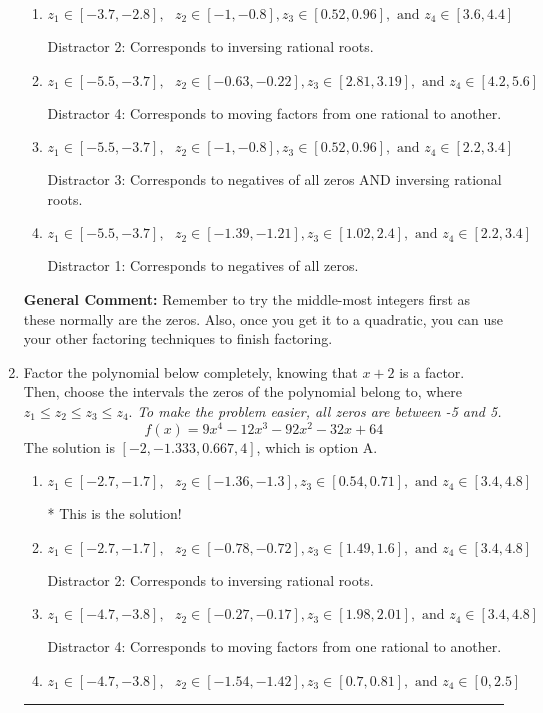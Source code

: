 \documentclass{extbook}[14pt]
\newcommand{\litem}[1]{\item #1

\rule{\textwidth}{0.4pt}}
\begin{document}
\begin{enumerate}
{\begin{enumerate}[label=\Alph*.]
* This is the solution!
\item \( z_1 \in [-3.7, -2.8], \text{   }  z_2 \in [-1, -0.8], z_3 \in [0.52, 0.96], \text{   and   } z_4 \in [3.6, 4.4] \)

 Distractor 2: Corresponds to inversing rational roots.
\item \( z_1 \in [-5.5, -3.7], \text{   }  z_2 \in [-0.63, -0.22], z_3 \in [2.81, 3.19], \text{   and   } z_4 \in [4.2, 5.6] \)

 Distractor 4: Corresponds to moving factors from one rational to another.
\item \( z_1 \in [-5.5, -3.7], \text{   }  z_2 \in [-1, -0.8], z_3 \in [0.52, 0.96], \text{   and   } z_4 \in [2.2, 3.4] \)

 Distractor 3: Corresponds to negatives of all zeros AND inversing rational roots.
\item \( z_1 \in [-5.5, -3.7], \text{   }  z_2 \in [-1.39, -1.21], z_3 \in [1.02, 2.4], \text{   and   } z_4 \in [2.2, 3.4] \)

 Distractor 1: Corresponds to negatives of all zeros.
\end{enumerate}

\textbf{General Comment:} Remember to try the middle-most integers first as these normally are the zeros. Also, once you get it to a quadratic, you can use your other factoring techniques to finish factoring.
}
\litem{
Factor the polynomial below completely, knowing that $x + 2$ is a factor. Then, choose the intervals the zeros of the polynomial belong to, where $z_1 \leq z_2 \leq z_3 \leq z_4$. \textit{To make the problem easier, all zeros are between -5 and 5.}
\[ f(x) = 9x^{4} -12 x^{3} -92 x^{2} -32 x + 64 \]The solution is \( [-2, -1.333, 0.667, 4] \), which is option A.\begin{enumerate}[label=\Alph*.]
\item \( z_1 \in [-2.7, -1.7], \text{   }  z_2 \in [-1.36, -1.3], z_3 \in [0.54, 0.71], \text{   and   } z_4 \in [3.4, 4.8] \)

* This is the solution!
\item \( z_1 \in [-2.7, -1.7], \text{   }  z_2 \in [-0.78, -0.72], z_3 \in [1.49, 1.6], \text{   and   } z_4 \in [3.4, 4.8] \)

 Distractor 2: Corresponds to inversing rational roots.
\item \( z_1 \in [-4.7, -3.8], \text{   }  z_2 \in [-0.27, -0.17], z_3 \in [1.98, 2.01], \text{   and   } z_4 \in [3.4, 4.8] \)

 Distractor 4: Corresponds to moving factors from one rational to another.
\item \( z_1 \in [-4.7, -3.8], \text{   }  z_2 \in [-1.54, -1.42], z_3 \in [0.7, 0.81], \text{   and   } z_4 \in [0, 2.5] \)


\end{enumerate}}
\end{enumerate}
\end{document}
